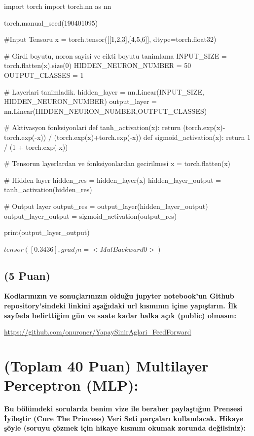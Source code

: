 \documentclass[11pt]{article}
\begin{document}
\begin{python}
import torch
import torch.nn as nn

torch.manual_seed(190401095)

#Input Tensoru
x = torch.tensor([[1,2,3],[4,5,6]], dtype=torch.float32)

# Girdi boyutu, noron sayisi ve cikti boyutu tanimlama
INPUT_SIZE = torch.flatten(x).size(0)
HIDDEN_NEURON_NUMBER = 50
OUTPUT_CLASSES = 1

# Layerlari tanimladik.
hidden_layer = nn.Linear(INPUT_SIZE, HIDDEN_NEURON_NUMBER)
output_layer = nn.Linear(HIDDEN_NEURON_NUMBER,OUTPUT_CLASSES)

# Aktivasyon fonksiyonlari
def tanh_activation(x):
  return (torch.exp(x)-torch.exp(-x)) / (torch.exp(x)+torch.exp(-x))
def sigmoid_activation(x):
  return 1 / (1 + torch.exp(-x))

# Tensorun layerlardan ve fonksiyonlardan gecirilmesi
x = torch.flatten(x)

# Hidden layer
hidden_res = hidden_layer(x)
hidden_layer_output = tanh_activation(hidden_res)

# Output layer
output_res = output_layer(hidden_layer_output)
output_layer_output = sigmoid_activation(output_res)

print(output_layer_output)
\end{python}

$tensor([0.3436], grad_fn=<MulBackward0>)$

\subsection{(5 Puan)} \textbf{Kodlarınızın ve sonuçlarınızın olduğu jupyter notebook'un Github repository'sindeki linkini aşağıdaki url kısmının içine yapıştırın. İlk sayfada belirttiğim gün ve saate kadar halka açık (public) olmasın:}

\url{https://github.com/onuroner/YapaySinirAglari_FeedForward}

\section{(Toplam 40 Puan) Multilayer Perceptron (MLP):} 
\textbf{Bu bölümdeki sorularda benim vize ile beraber paylaştığım Prensesi İyileştir (Cure The Princess) Veri Seti parçaları kullanılacak. Hikaye şöyle (soruyu çözmek için hikaye kısmını okumak zorunda değilsiniz):} 
\end{document}
